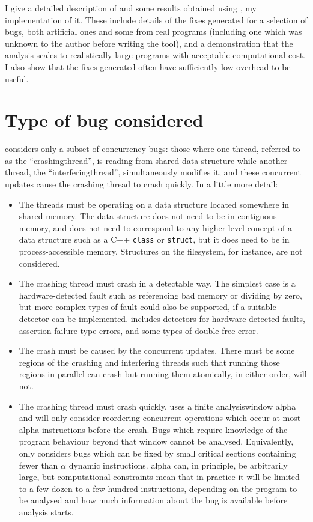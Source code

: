 I give a detailed description of {\technique} and some results
obtained using \implementation, my implementation of it.  These
include details of the fixes generated for a selection of bugs, both
artificial ones and some from real programs (including one which was
unknown to the author before writing the tool), and a demonstration
that the analysis scales to realistically large programs with
acceptable computational cost.  I also show that the fixes generated
often have sufficiently low overhead to be useful.

\section{Type of bug considered}
\label{sect:types_of_bugs}

{\Technique} considers only a subset of concurrency bugs: those where
one thread, referred to as the ``\gls{crashingthread}'', is reading
from shared data structure while another thread, the
``\gls{interferingthread}'', simultaneously modifies it, and these
concurrent updates cause the crashing thread to crash quickly.  In a
little more detail:

\begin{itemize}
\item The threads must be operating on a data structure located
  somewhere in shared memory.  The data structure does not need to be
  in contiguous memory, and does not need to correspond to any
  higher-level concept of a data structure such as a C++
  \texttt{class} or \texttt{struct}, but it does need to be in
  process-accessible memory.  Structures on the filesystem, for
  instance, are not considered.
\item The crashing thread must crash in a detectable way.  The
  simplest case is a hardware-detected fault such as referencing bad
  memory or dividing by zero, but more complex types of fault could
  also be supported, if a suitable detector can be implemented.
  {\Implementation} includes detectors for hardware-detected faults,
  assertion-failure type errors, and some types of double-free error.
\item The crash must be caused by the concurrent updates.  There must
  be some regions of the crashing and interfering threads such that
  running those regions in parallel can crash but running them
  atomically, in either order, will not.
\item The crashing thread must crash quickly.  {\Technique} uses a
  finite \gls{analysiswindow} \gls{alpha} and will only consider
  reordering concurrent operations which occur at most \gls{alpha}
  instructions before the crash.  Bugs which require knowledge of the
  program behaviour beyond that window cannot be analysed.
  Equivalently, {\technique} only considers bugs which can be fixed by
  small critical sections containing fewer than $\alpha$ dynamic
  instructions.  \gls{alpha} can, in principle, be arbitrarily large,
  but computational constraints mean that in practice it will be
  limited to a few dozen to a few hundred instructions, depending on
  the program to be analysed and how much information about the bug is
  available before analysis starts.
\end{itemize}

